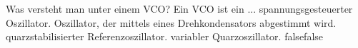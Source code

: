     {Was versteht man unter einem VCO? Ein VCO ist ein ...}
    {spannungsgesteuerter Oszillator.}
    {Oszillator, der mittels eines Drehkondensators abgestimmt wird.}
    {quarzstabilisierter Referenzoszillator.}
    {variabler Quarzoszillator.}
    {false}{false}